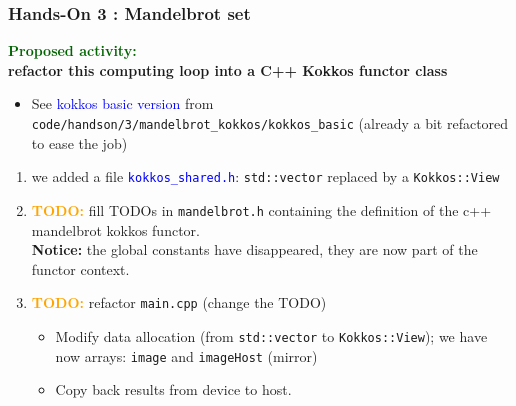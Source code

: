 \begin{frame}[fragile=singleslide]
  \frametitle{Hands-On 3 : Mandelbrot set}

  {\Large \textcolor{darkgreen}{\textbf{Proposed activity:}}\\ \textbf{refactor this computing loop into a C++ Kokkos functor class}}
  \begin{itemize}
  \item See \textcolor{blue}{kokkos basic version} from \texttt{code/handson/3/mandelbrot\_kokkos/kokkos\_basic} (already a bit refactored to ease the job)
  \end{itemize}
  \begin{enumerate}
  \item we added a file \textcolor{blue}{\texttt{kokkos\_shared.h}}: \texttt{std::vector} replaced by a \texttt{Kokkos::View}
  \item \textcolor{orange}{\textbf{TODO:}} fill TODOs in \texttt{mandelbrot.h} containing the definition of the c++ mandelbrot kokkos functor.\\
    \textbf{Notice:} the global constants have disappeared, they are now part of the functor context.
  \item \textcolor{orange}{\textbf{TODO:}} refactor \texttt{main.cpp} (change the TODO)
    \begin{itemize}
    \item Modify data allocation (from \texttt{std::vector} to \texttt{Kokkos::View}); we have now arrays: \texttt{image} and \texttt{imageHost} (mirror)
    \item Copy back results from device to host.
    \end{itemize}
  \end{enumerate}
  
\end{frame}

